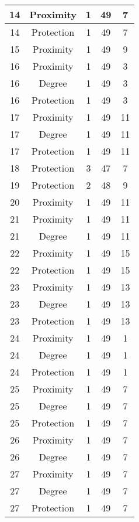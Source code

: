 \documentclass[results.tex]{subfiles}
\begin{document}
\begin{center}
\begin{tabular}{| c || c | c | c | c |}
    \hline
    14 & Proximity & 1 & 49 & 7 \\ 
    \hline
    14 & Protection & 1 & 49 & 7 \\ 
    \hline
    15 & Proximity & 1 & 49 & 9 \\ 
    \hline
    16 & Proximity & 1 & 49 & 3 \\ 
    \hline
    16 & Degree & 1 & 49 & 3 \\ 
    \hline
    16 & Protection & 1 & 49 & 3 \\ 
    \hline
    17 & Proximity & 1 & 49 & 11 \\ 
    \hline
    17 & Degree & 1 & 49 & 11 \\ 
    \hline
    17 & Protection & 1 & 49 & 11 \\ 
    \hline
    18 & Protection & 3 & 47 & 7 \\ 
    \hline
    19 & Protection & 2 & 48 & 9 \\ 
    \hline
    20 & Proximity & 1 & 49 & 11 \\ 
    \hline
    21 & Proximity & 1 & 49 & 11 \\ 
    \hline
    21 & Degree & 1 & 49 & 11 \\ 
    \hline
    22 & Proximity & 1 & 49 & 15 \\ 
    \hline
    22 & Protection & 1 & 49 & 15 \\ 
    \hline
    23 & Proximity & 1 & 49 & 13 \\ 
    \hline
    23 & Degree & 1 & 49 & 13 \\ 
    \hline
    23 & Protection & 1 & 49 & 13 \\ 
    \hline
    24 & Proximity & 1 & 49 & 1 \\ 
    \hline
    24 & Degree & 1 & 49 & 1 \\ 
    \hline
    24 & Protection & 1 & 49 & 1 \\ 
    \hline
    25 & Proximity & 1 & 49 & 7 \\ 
    \hline
    25 & Degree & 1 & 49 & 7 \\ 
    \hline
    25 & Protection & 1 & 49 & 7 \\ 
    \hline
    26 & Proximity & 1 & 49 & 7 \\ 
    \hline
    26 & Degree & 1 & 49 & 7 \\ 
    \hline
    27 & Proximity & 1 & 49 & 7 \\ 
    \hline
    27 & Degree & 1 & 49 & 7 \\ 
    \hline
    27 & Protection & 1 & 49 & 7 \\ 

\end{tabular}
\end{center}
\end{document}
